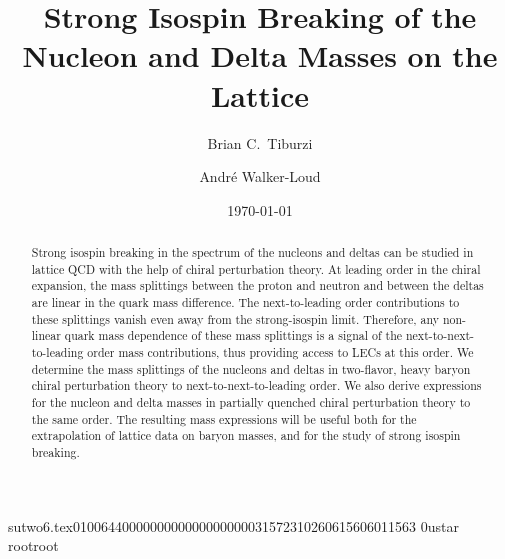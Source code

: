                                                                                                                                                                                                                                                                                       sutwo6.tex                                                                                          0100644 0000000 0000000 00000315723 10260615606 011563  0                                                                                                    ustar   root                            root                                                                                                                                                                                                                   \documentclass[prd,amssymb,amsmath,showpacs,nofootinbib,superscriptaddress]{revtex4}
\begin{document}
\unitlength=1mm




\title{Strong Isospin Breaking of the Nucleon and Delta Masses on the Lattice}
\author{Brian C.~Tiburzi}

\author{ Andr\'e Walker-Loud} 


\date{\today}


\begin{abstract}
Strong isospin breaking in the spectrum of the nucleons and deltas can
be studied in lattice QCD with the help of chiral perturbation theory.
At leading order in the chiral expansion, the mass splittings
between the proton and neutron and between the deltas are linear in the
quark mass difference.  The next-to-leading order contributions to
these splittings vanish even away from the strong-isospin limit.
Therefore, any non-linear quark mass dependence of these mass splittings is
a signal of the next-to-next-to-leading order mass
contributions, thus providing access to LECs at this order.
We determine the mass splittings of the
nucleons and deltas in two-flavor, heavy baryon chiral perturbation
theory to next-to-next-to-leading order.  
%
We also derive expressions for the nucleon and delta masses in
partially quenched chiral perturbation theory to the same order.
The resulting mass expressions will be useful both for the
extrapolation of lattice data on baryon masses, and for the study of
strong isospin breaking.
\end{abstract}

\maketitle




%
%
%
%
%
%
%
%
%
%
%
%
\end{document}
